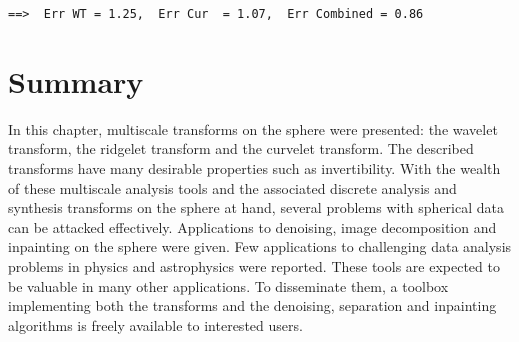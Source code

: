 \begin{verbatim}
==>  Err WT = 1.25,  Err Cur  = 1.07,  Err Combined = 0.86
\end{verbatim}


\section{Summary}
In this chapter, multiscale transforms on the sphere were presented: the wavelet transform, the ridgelet transform and the curvelet transform. The described transforms have many desirable properties such as invertibility. With the wealth of these multiscale analysis tools and the associated discrete analysis and synthesis transforms on the sphere at hand, several problems with spherical data can be attacked effectively.  
Applications to denoising, image decomposition and inpainting on the sphere were given. Few applications to challenging data analysis problems in physics and astrophysics were reported. These tools are expected to be valuable in many other applications. To disseminate them, a toolbox implementing both the transforms and the denoising, separation and inpainting algorithms is freely available to interested users.
  

